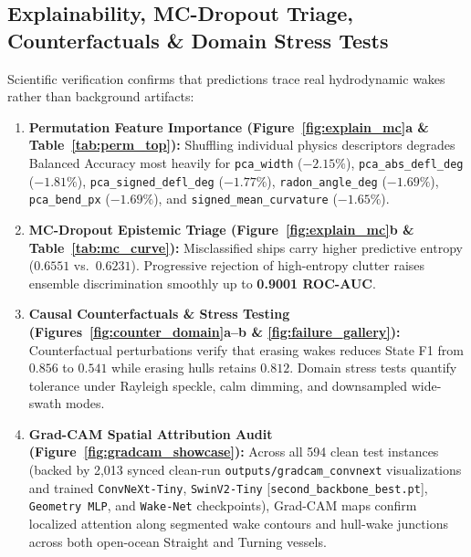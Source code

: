 \documentclass[11pt,a4paper]{article}
\begin{document}
\subsection{Explainability, MC-Dropout Triage, Counterfactuals \& Domain Stress Tests}
Scientific verification confirms that predictions trace real hydrodynamic wakes rather than background artifacts:
\begin{enumerate}[leftmargin=1.5em]
    \item \textbf{Permutation Feature Importance (Figure~\ref{fig:explain_mc}a \& Table~\ref{tab:perm_top}):} Shuffling individual physics descriptors degrades Balanced Accuracy most heavily for \texttt{pca\_width} ($-2.15\%$), \texttt{pca\_abs\_defl\_deg} ($-1.81\%$), \texttt{pca\_signed\_defl\_deg} ($-1.77\%$), \texttt{radon\_angle\_deg} ($-1.69\%$), \texttt{pca\_bend\_px} ($-1.69\%$), and \texttt{signed\_mean\_curvature} ($-1.65\%$).
    \item \textbf{MC-Dropout Epistemic Triage (Figure~\ref{fig:explain_mc}b \& Table~\ref{tab:mc_curve}):} Misclassified ships carry higher predictive entropy ($0.6551$ vs.\ $0.6231$). Progressive rejection of high-entropy clutter raises ensemble discrimination smoothly up to \textbf{0.9001 ROC-AUC}.
    \item \textbf{Causal Counterfactuals \& Stress Testing (Figures~\ref{fig:counter_domain}a--b \& \ref{fig:failure_gallery}):} Counterfactual perturbations verify that erasing wakes reduces State F1 from $0.856$ to $0.541$ while erasing hulls retains $0.812$. Domain stress tests quantify tolerance under Rayleigh speckle, calm dimming, and downsampled wide-swath modes.
    \item \textbf{Grad-CAM Spatial Attribution Audit (Figure~\ref{fig:gradcam_showcase}):} Across all 594 clean test instances (backed by 2,013 synced clean-run \texttt{outputs/gradcam\_convnext} visualizations and trained \texttt{ConvNeXt-Tiny}, \texttt{SwinV2-Tiny} [\texttt{second\_backbone\_best.pt}], \texttt{Geometry MLP}, and \texttt{Wake-Net} checkpoints), Grad-CAM maps confirm localized attention along segmented wake contours and hull-wake junctions across both open-ocean Straight and Turning vessels.
\end{enumerate}
\end{document}
